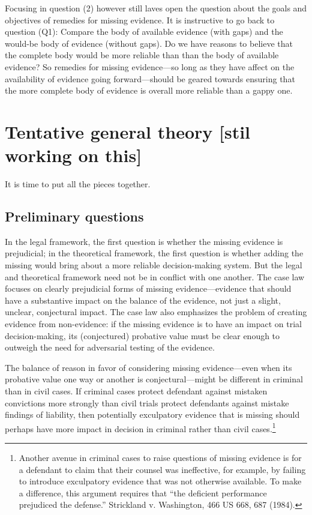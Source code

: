 \documentclass[
  10pt,
  dvipsnames,enabledeprecatedfontcommands]{scrartcl}
\begin{document}
Focusing in question (2) however still laves open the question about the
goals and objectives of remedies for missing evidence. It is instructive
to go back to question (Q1): Compare the body of available evidence
(with gaps) and the would-be body of evidence (without gaps). Do we have
reasons to believe that the complete body would be more reliable than
than the body of available evidence? So remedies for missing
evidence---so long as they have affect on the availability of evidence
going forward---should be geared towards ensuring that the more complete
body of evidence is overall more reliable than a gappy one.

\hypertarget{tentative-general-theory-stil-working-on-this}{%
\section{Tentative general theory {[}stil working on
this{]}}\label{tentative-general-theory-stil-working-on-this}}

It is time to put all the pieces together.

\hypertarget{preliminary-questions}{%
\subsection{Preliminary questions}\label{preliminary-questions}}

In the legal framework, the first question is whether the missing
evidence is prejudicial; in the theoretical framework, the first
question is whether adding the missing would bring about a more reliable
decision-making system. But the legal and theoretical framework need not
be in conflict with one another. The case law focuses on clearly
prejudicial forms of missing evidence---evidence that should have a
substantive impact on the balance of the evidence, not just a slight,
unclear, conjectural impact. The case law also emphasizes the problem of
creating evidence from non-evidence: if the missing evidence is to have
an impact on trial decision-making, its (conjectured) probative value
must be clear enough to outweigh the need for adversarial testing of the
evidence.

The balance of reason in favor of considering missing evidence---even
when its probative value one way or another is conjectural---might be
different in criminal than in civil cases. If criminal cases protect
defendant against mistaken convictions more strongly than civil trials
protect defendants against mistake findings of liability, then
potentially exculpatory evidence that is missing should perhaps have
more impact in decision in criminal rather than civil cases.\footnote{Another
  avenue in criminal cases to raise questions of missing evidence is for
  a defendant to claim that their counsel was ineffective, for example,
  by failing to introduce exculpatory evidence that was not otherwise
  available. To make a difference, this argument requires that ``the
  deficient performance prejudiced the defense.'' Strickland v.
  Washington, 466 US 668, 687 (1984).}
\end{document}
